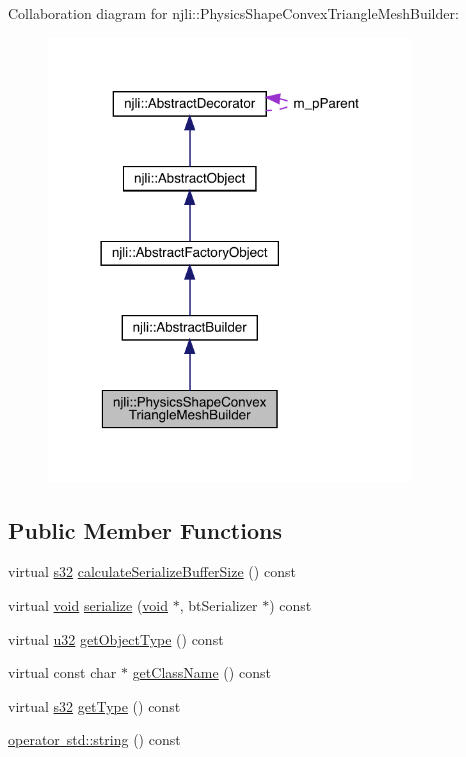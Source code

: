 Collaboration diagram for njli\+:\+:Physics\+Shape\+Convex\+Triangle\+Mesh\+Builder\+:\nopagebreak
\begin{figure}[H]
\begin{center}
\leavevmode
\includegraphics[width=273pt]{classnjli_1_1_physics_shape_convex_triangle_mesh_builder__coll__graph}
\end{center}
\end{figure}
\subsection*{Public Member Functions}
\begin{DoxyCompactItemize}
\item 
virtual \mbox{\hyperlink{_util_8h_aa62c75d314a0d1f37f79c4b73b2292e2}{s32}} \mbox{\hyperlink{classnjli_1_1_physics_shape_convex_triangle_mesh_builder_a4fcf9f8e56c67482a47f7cc5e8011cce}{calculate\+Serialize\+Buffer\+Size}} () const
\item 
virtual \mbox{\hyperlink{_thread_8h_af1e856da2e658414cb2456cb6f7ebc66}{void}} \mbox{\hyperlink{classnjli_1_1_physics_shape_convex_triangle_mesh_builder_a96fabe0bd23c01c752b08a547ab2cad2}{serialize}} (\mbox{\hyperlink{_thread_8h_af1e856da2e658414cb2456cb6f7ebc66}{void}} $\ast$, bt\+Serializer $\ast$) const
\item 
virtual \mbox{\hyperlink{_util_8h_a10e94b422ef0c20dcdec20d31a1f5049}{u32}} \mbox{\hyperlink{classnjli_1_1_physics_shape_convex_triangle_mesh_builder_a70cd9cc21ecfc663d38f225702878bdc}{get\+Object\+Type}} () const
\item 
virtual const char $\ast$ \mbox{\hyperlink{classnjli_1_1_physics_shape_convex_triangle_mesh_builder_a89df3bb6663f332d53cd2e589949283c}{get\+Class\+Name}} () const
\item 
virtual \mbox{\hyperlink{_util_8h_aa62c75d314a0d1f37f79c4b73b2292e2}{s32}} \mbox{\hyperlink{classnjli_1_1_physics_shape_convex_triangle_mesh_builder_ad634d7d778ce6db1f63d1cc0cb77b965}{get\+Type}} () const
\item 
\mbox{\hyperlink{classnjli_1_1_physics_shape_convex_triangle_mesh_builder_a16ba52e48166d70f3522f0c5f4ddedfc}{operator std\+::string}} () const
\end{DoxyCompactItemize}
